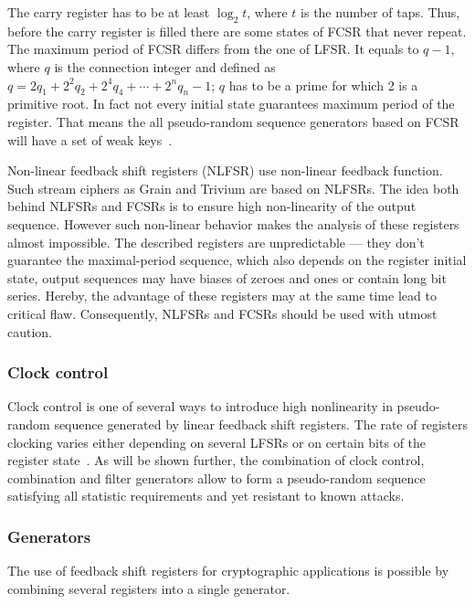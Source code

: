 The carry register has to be at least $\log_2 t$, where $t$ is the number of
taps. Thus, before the carry register is
filled there are some states of FCSR that never repeat. The maximum period of
FCSR differs from the one of LFSR. It equals to $q - 1$, where $q$ is the
connection integer and defined as 
$q = 2 q_1 + 2^2 q_2 + 2^4 q_4 + \cdots + 2^n q_n - 1$; $q$ has to be a prime
for which 2 is a primitive root. In fact not every initial state guarantees
maximum period of the register. That means the all pseudo-random sequence
generators based on FCSR will have a set of weak
keys~\cite{schneier:applied_cryptography:2}.

Non-linear feedback shift registers (NLFSR) use non-linear feedback function.
Such stream ciphers as Grain and Trivium are based on NLFSRs.  The idea both
behind NLFSRs and FCSRs is to ensure high non-linearity of the output sequence.
However such non-linear behavior makes the analysis of these registers almost
impossible. The described registers are unpredictable --- they don't guarantee
the maximal-period sequence, which also depends on the register initial state,
output sequences may have biases of zeroes and ones or contain long bit series.
Hereby, the advantage of these registers may at the same time lead to critical
flaw. Consequently, NLFSRs and FCSRs should be used with utmost caution.


\subsubsection{Clock control}

Clock control is one of several ways to introduce high nonlinearity in
pseudo-random sequence generated by linear feedback shift registers. The rate of
registers clocking varies either depending on several LFSRs or on certain bits
of the register state~\cite{usm:streamciphers}. As will be shown further, the combination of clock
control, combination and filter generators allow to form a pseudo-random
sequence satisfying all statistic requirements and yet resistant to known
attacks.

\subsubsection{Generators}                          

The use of feedback shift registers for cryptographic applications is possible by
combining several registers into a single generator. 

